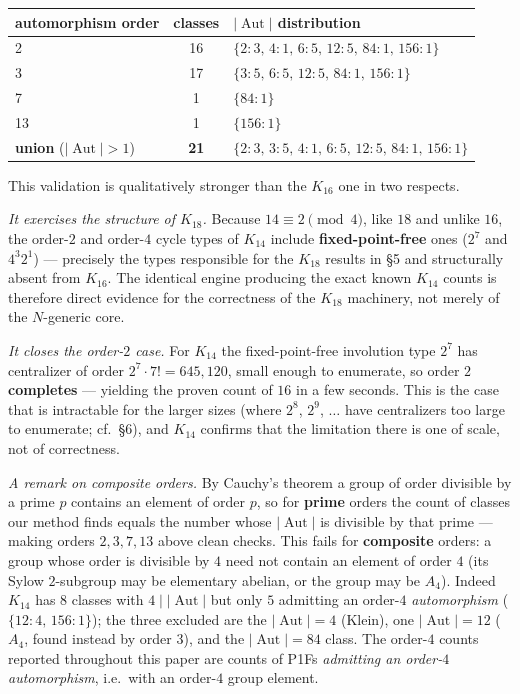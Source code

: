 \documentclass[11pt,reqno]{amsart}
\theoremstyle{plain}
\theoremstyle{definition}
\numberwithin{theorem}{section}
\newcommand{\Aut}{\operatorname{Aut}}
\begin{document}
\begin{center}
\begin{tabular}{lcl}
\toprule
automorphism order & classes & $|\Aut|$ distribution \\
\midrule
2 & 16 & $\{2{:}3,\,4{:}1,\,6{:}5,\,12{:}5,\,84{:}1,\,156{:}1\}$ \\
3 & 17 & $\{3{:}5,\,6{:}5,\,12{:}5,\,84{:}1,\,156{:}1\}$ \\
7 & 1  & $\{84{:}1\}$ \\
13 & 1 & $\{156{:}1\}$ \\
\midrule
\textbf{union} ($|\Aut|>1$) & \textbf{21} & $\{2{:}3,\,3{:}5,\,4{:}1,\,6{:}5,\,12{:}5,\,84{:}1,\,156{:}1\}$ \\
\bottomrule
\end{tabular}
\end{center}

This validation is qualitatively stronger than the $K_{16}$ one in two respects.

\medskip
\noindent\emph{It exercises the structure of $K_{18}$.} Because $14\equiv 2\pmod 4$, like $18$ and
unlike $16$, the order-$2$ and order-$4$ cycle types of $K_{14}$ include
\textbf{fixed-point-free} ones ($2^7$ and $4^3 2^1$) --- precisely the types responsible for
the $K_{18}$ results in \S5 and structurally absent from $K_{16}$. The identical engine
producing the exact known $K_{14}$ counts is therefore direct evidence for the
correctness of the $K_{18}$ machinery, not merely of the $N$-generic core.

\medskip
\noindent\emph{It closes the order-$2$ case.} For $K_{14}$ the fixed-point-free involution type
$2^7$ has centralizer of order $2^7\cdot 7! = 645{,}120$, small enough to enumerate,
so order $2$ \textbf{completes} --- yielding the proven count of $16$ in a few seconds. This
is the case that is intractable for the larger sizes (where $2^8$, $2^9$, $\dots$ have
centralizers too large to enumerate; cf.\ \S6), and $K_{14}$ confirms that the
limitation there is one of scale, not of correctness.

\medskip
\noindent\emph{A remark on composite orders.} By Cauchy's theorem a group of order divisible by a
prime $p$ contains an element of order $p$, so for \textbf{prime} orders the count of
classes our method finds equals the number whose $|\Aut|$ is divisible by that
prime --- making orders $2,3,7,13$ above clean checks. This fails for \textbf{composite}
orders: a group whose order is divisible by $4$ need not contain an element of order
$4$ (its Sylow $2$-subgroup may be elementary abelian, or the group may be $A_4$).
Indeed $K_{14}$ has $8$ classes with $4\mid|\Aut|$ but only $5$ admitting an
order-$4$ \emph{automorphism} ($\{12{:}4,\,156{:}1\}$); the three excluded are the
$|\Aut|=4$ (Klein), one $|\Aut|=12$ ($A_4$, found instead by order
$3$), and the $|\Aut|=84$ class. The order-$4$ counts reported throughout this
paper are counts of P1Fs \emph{admitting an order-$4$ automorphism}, i.e.\ with an order-$4$
group element.
\end{document}
